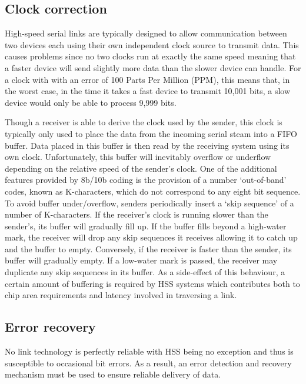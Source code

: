 		\subsection{Clock correction}
			
			High-speed serial links are typically designed to allow communication
			between two devices each using their own independent clock source to
			transmit data. This causes problems since no two clocks run at exactly the
			same speed meaning that a faster device will send slightly more data than
			the slower device can handle. For a clock with with an error of 100 Parts
			Per Million (PPM), this means that, in the worst case, in the time it
			takes a fast device to transmit 10,001 bits, a slow device would only be
			able to process 9,999 bits.
			
			Though a receiver is able to derive the clock used by the sender, this
			clock is typically only used to place the data from the incoming serial
			steam into a FIFO buffer. Data placed in this buffer is then read by the
			receiving system using its own clock. Unfortunately, this buffer will
			inevitably overflow or underflow depending on the relative speed of the
			sender's clock. One of the additional features provided by 8b/10b coding
			is the provision of a number `out-of-band' codes, known as K-characters,
			which do not correspond to any eight bit sequence. To avoid buffer
			under/overflow, senders periodically insert a `skip sequence' of a number
			of K-characters.  If the receiver's clock is running slower than the
			sender's, its buffer will gradually fill up. If the buffer fills beyond a
			high-water mark, the receiver will drop any skip sequences it receives
			allowing it to catch up and the buffer to empty. Conversely, if the
			receiver is faster than the sender, its buffer will gradually empty.  If a
			low-water mark is passed, the receiver may duplicate any skip sequences in
			its buffer. As a side-effect of this behaviour, a certain amount of
			buffering is required by HSS systems which contributes both to chip area
			requirements and latency involved in traversing a link.
		
		\subsection{Error recovery}
			
			No link technology is perfectly reliable with HSS being no exception and
			thus is susceptible to occasional bit errors. As a result, an error
			detection and recovery mechanism must be used to ensure reliable delivery
			of data.
			
